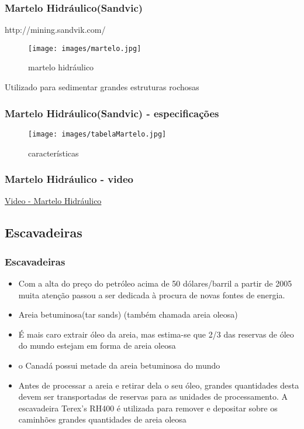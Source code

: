 \documentclass{beamer}
\begin{document}
\begin{frame}
	\frametitle{Martelo Hidráulico(Sandvic)}
	http://mining.sandvik.com/
    \begin{figure}
    	\centering
    	\texttt{[image: images/martelo.jpg]}
		\caption{martelo hidráulico}
		\label{fig:martelo}
    \end{figure}
    Utilizado para sedimentar grandes estruturas rochosas
\end{frame}

\begin{frame}
	\frametitle{Martelo Hidráulico(Sandvic) - especificações}
    \begin{figure}
    	\centering
    	\texttt{[image: images/tabelaMartelo.jpg]}
		\caption{características}
		\label{fig:tabelaMartel}
    \end{figure}

\end{frame}

\begin{frame}
	\frametitle{Martelo Hidráulico - video}
\href{https://www.youtube.com/watch?v=ZH6zKVYxUhk}{Video - Martelo Hidráulico}
\end{frame}


\subsection{Escavadeiras}

\begin{frame}
	\frametitle{Escavadeiras}
    \begin{itemize}
        \item Com a alta do preço do petróleo acima de 50 dólares/barril a partir de 2005 muita atenção passou a ser dedicada à procura de novas fontes de energia.
        \item Areia betuminosa(tar sands) (também chamada areia oleosa)
        \item É mais caro extrair óleo da areia, mas estima-se que 2/3 das reservas de óleo do mundo estejam em forma de areia oleosa
        \item o Canadá possui metade da areia betuminosa do mundo
        \item Antes de processar a areia e retirar dela o seu óleo, grandes quantidades desta devem ser transportadas de reservas para as unidades de processamento. A escavadeira Terex's RH400 é utilizada para remover e depositar sobre os caminhões grandes quantidades de areia oleosa 
    \end{itemize}
\end{frame}
\end{document}
